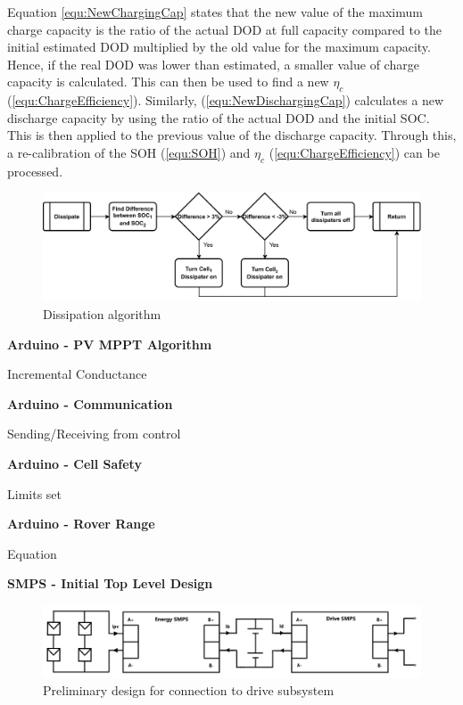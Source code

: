 \documentclass[10pt,twoside]{article}
\begin{document}
Equation \ref{equ:NewChargingCap} states that the new value of the maximum charge capacity is the ratio of the actual DOD at full capacity compared to the initial estimated DOD multiplied by the old value for the maximum capacity. Hence, if the real DOD was lower than estimated, a smaller value of charge capacity is calculated. This can then be used to find a new $\eta_c$ (\ref{equ:ChargeEfficiency}). Similarly, (\ref{equ:NewDischargingCap}) calculates a new discharge capacity by using the ratio of the actual DOD and the initial SOC. This is then applied to the previous value of the discharge capacity. Through this, a re-calibration of the SOH (\ref{equ:SOH}) and $\eta_c$ (\ref{equ:ChargeEfficiency}) can be processed.

\begin{figure}[hbt]
    \centering
    \includegraphics[scale = 0.75]{Dissipate (3).pdf}
    \caption{Dissipation algorithm}
    \label{fig:DisAlgorithm}
\end{figure}

\textbf{Arduino - PV MPPT Algorithm}

Incremental Conductance

\textbf{Arduino - Communication}

Sending/Receiving from control

\textbf{Arduino - Cell Safety}

Limits set

\textbf{Arduino - Rover Range}

Equation

\textbf{SMPS - Initial Top Level Design}

\begin{figure}[hbt]
\includegraphics[width = \linewidth]{SMPS}
\centering
\caption{Preliminary design for connection to drive subsystem}
\label{fig:InitalDesign}
\end{figure}
\end{document}
